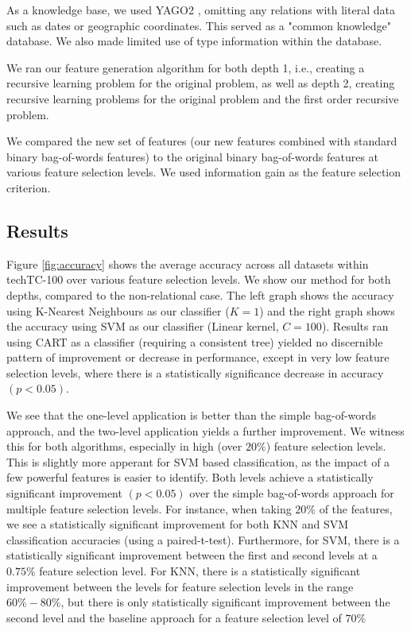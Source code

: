 \documentclass{article}
\theoremstyle{definition}
\begin{document}
As a knowledge base, we used YAGO2 \citep{hoffart2013yago2}, omitting any relations with literal data such as dates or geographic coordinates. This served as a "common knowledge" database. We also made limited use of type information within the database.

We ran our feature generation algorithm for both depth 1, i.e., creating a recursive learning problem for the original problem, as well as depth 2, creating recursive learning problems for the original problem and the first order recursive problem.

We compared the new set of features (our new features combined with standard binary bag-of-words features) to the original binary bag-of-words features at various feature selection levels. We used information gain as the feature selection criterion.

\subsection{Results}
Figure \ref{fig:accuracy} shows the average accuracy across all datasets within techTC-100 over various feature selection levels. We show our method for both depths, compared to the non-relational case.  The left graph shows the accuracy using K-Nearest Neighbours \citep{fix1951discriminatory} as our classifier ($K=1$) and the right graph shows the accuracy using SVM \citep{cortes1995support} as our classifier (Linear kernel, $C=100$). Results ran using CART \citep{steinberg2009cart} as a classifier (requiring a consistent tree) yielded no discernible pattern of improvement or decrease in performance, except in very low feature selection levels, where there is a statistically significance decrease in accuracy $ (p<0.05) $.

We see that the one-level application is better than the simple bag-of-words approach, and the two-level application yields a further improvement. We witness this for both algorithms, especially in high (over $20\%$) feature selection levels. This is slightly more apperant for SVM based classification, as the impact of a few powerful features is easier to identify. Both levels achieve a statistically significant improvement $ (p<0.05) $ over the simple bag-of-words approach for multiple feature selection levels. For instance, when taking $20\% $ of the features, we see a statistically significant improvement for both KNN and SVM classification accuracies (using a paired-t-test).  
Furthermore, for SVM, there is a statistically significant improvement between the first and second levels at a $0.75\%$ feature selection level. For KNN, there is a statistically significant improvement between the levels for feature selection levels in the range $60\%-80\%$, but there is only statistically significant improvement between the second level and the baseline approach for a feature selection level of $70\%$
\end{document}
